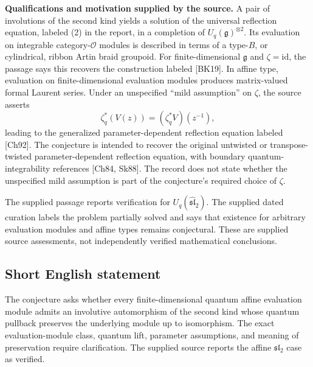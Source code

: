 \documentclass[11pt]{article}
\begin{document}
\textbf{Qualifications and motivation supplied by the source.} A pair of involutions of the second kind yields a solution of the universal reflection equation, labeled (2) in the report, in a completion of \(U_q(\mathfrak g)^{\otimes 2}\). Its evaluation on integrable category-\(\mathcal O\) modules is described in terms of a type-\(B\), or cylindrical, ribbon Artin braid groupoid. For finite-dimensional \(\mathfrak g\) and \(\zeta=\mathrm{id}\), the passage says this recovers the construction labeled [BK19]. In affine type, evaluation on finite-dimensional evaluation modules produces matrix-valued formal Laurent series. Under an unspecified ``mild assumption'' on \(\zeta\), the source asserts
\[
 \zeta_q^*(V(z))=(\zeta_q^*V)(z^{-1}),
\]
leading to the generalized parameter-dependent reflection equation labeled [Ch92]. The conjecture is intended to recover the original untwisted or transpose-twisted parameter-dependent reflection equation, with boundary quantum-integrability references [Ch84, Sk88]. The record does not state whether the unspecified mild assumption is part of the conjecture's required choice of \(\zeta\).

The supplied passage reports verification for \(U_q(\widehat{\mathfrak{sl}}_2)\). The supplied dated curation labels the problem partially solved and says that existence for arbitrary evaluation modules and affine types remains conjectural. These are supplied source assessments, not independently verified mathematical conclusions.
\subsection{Short English statement}
The conjecture asks whether every finite-dimensional quantum affine evaluation module admits an involutive automorphism of the second kind whose quantum pullback preserves the underlying module up to isomorphism. The exact evaluation-module class, quantum lift, parameter assumptions, and meaning of preservation require clarification. The supplied source reports the affine \(\mathfrak{sl}_2\) case as verified.
\end{document}
